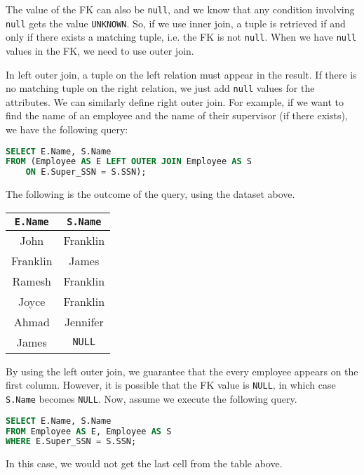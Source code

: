 \documentclass[a4paper, openany]{memoir}
\begin{document}
The value of the FK can also be \texttt{null}, and we know that any condition involving \texttt{null} gets the value \texttt{UNKNOWN}. So, if we use inner join, a tuple is retrieved if and only if there exists a matching tuple, i.e. the FK is not \texttt{null}. When we have \texttt{null} values in the FK, we need to use outer join.

In left outer join, a tuple on the left relation must appear in the result. If there is no matching tuple on the right relation, we just add \texttt{null} values for the attributes. We can similarly define right outer join. For example, if we want to find the name of an employee and the name of their supervisor (if there exists), we have the following query:
\begin{lstlisting}[language=SQL]
SELECT E.Name, S.Name
FROM (Employee AS E LEFT OUTER JOIN Employee AS S 
    ON E.Super_SSN = S.SSN);
\end{lstlisting}
The following is the outcome of the query, using the dataset above.
\begin{table}[H]
    \centering
    \begin{tabular}{|c|c|}
        \hline
        \texttt{E.Name} & \texttt{S.Name}  \\
        \hline
        John & Franklin  \\
        Franklin  & James \\
        Ramesh & Franklin \\
        Joyce & Franklin \\
        Ahmad & Jennifer \\
        James & \texttt{NULL} \\
        \hline
    \end{tabular}
\end{table}
\noindent By using the left outer join, we guarantee that the every employee appears on the first column. However, it is possible that the FK value is \texttt{NULL}, in which case \texttt{S.Name} becomes \texttt{NULL}. Now, assume we execute the following query.
\begin{lstlisting}[language=SQL]
SELECT E.Name, S.Name
FROM Employee AS E, Employee AS S
WHERE E.Super_SSN = S.SSN;
\end{lstlisting}
In this case, we would not get the last cell from the table above.
\newpage
\end{document}
